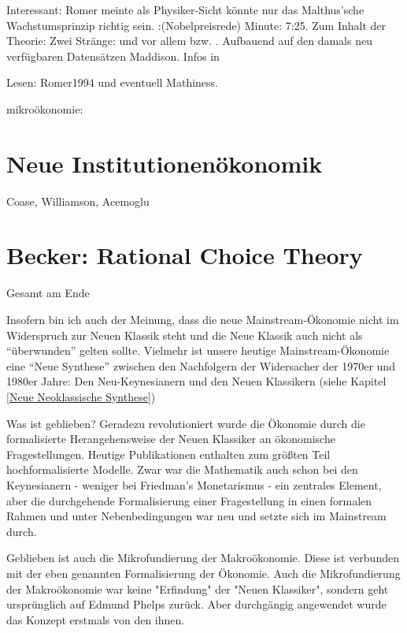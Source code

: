 Interessant: Romer meinte als Physiker-Sicht könnte nur das Malthus'sche Wachstumsprinzip richtig sein. :(Nobelpreisrede) \textcite{Romer2018} Minute: 7:25.
Zum Inhalt der Theorie: Zwei Stränge: \textcite{Romer1986} und vor allem \textcite{Romer1990} bzw. \textcite{Lucas1988}. 
Aufbauend auf den damals neu verfügbaren Datensätzen Maddison. Infos in \textcite{Romer1994}

Lesen: Romer1994 und eventuell Mathiness.



mikroökonomie:
\section{Neue Institutionenökonomik}
Coase, Williamson, Acemoglu

\section{Becker: Rational Choice Theory}














Gesamt am Ende



Insofern bin ich auch der Meinung, dass die neue Mainstream-Ökonomie nicht im Widerspruch zur Neuen Klassik steht und die Neue Klassik auch nicht als "`überwunden"' gelten sollte. Vielmehr ist unsere heutige Mainstream-Ökonomie eine "`Neue Synthese"' zwischen den Nachfolgern der Widersacher der 1970er und 1980er Jahre: Den Neu-Keynesianern und den Neuen Klassikern (siehe Kapitel \ref{Neue Neoklassische Synthese})


Was ist geblieben? Geradezu revolutioniert wurde die Ökonomie durch die formalisierte Herangehensweise der Neuen Klassiker an ökonomische Fragestellungen. Heutige Publikationen enthalten zum größten Teil hochformalisierte Modelle. Zwar war die Mathematik auch schon bei den Keynesianern - weniger bei Friedman's Monetarismus - ein zentrales Element, aber die durchgehende Formalisierung einer Fragestellung in einen formalen Rahmen und unter Nebenbedingungen war neu und setzte sich im Mainstream durch.

Geblieben ist auch die Mikrofundierung der Makroökonomie. Diese ist verbunden mit der eben genannten Formalisierung der Ökonomie. Auch die Mikrofundierung der Makroökonomie war keine "Erfindung" der "Neuen Klassiker", sondern geht ursprünglich auf Edmund Phelps zurück. Aber durchgängig angewendet wurde das Konzept erstmals von den ihnen.

